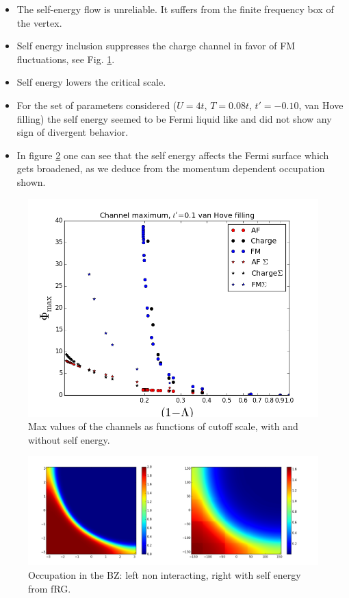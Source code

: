 \begin{itemize}

\item The self-energy flow is unreliable. It suffers from the finite frequency box of the vertex. 

\item Self energy inclusion suppresses the charge channel in favor of FM fluctuations, see Fig. \ref{selfsuppressfrg}. 

\item Self energy lowers the critical scale.

\item For the set of parameters considered ($U=4t$, $T=0.08t$, $t'=-0.10$, van Hove filling) the self energy seemed to be Fermi liquid like and did not show any sign of divergent behavior. 

\item In figure \ref{fermisurface} one can see that the self energy affects the Fermi surface which gets broadened, as we deduce from the momentum dependent occupation shown. 

\end{itemize}

\begin{figure}
\includegraphics[scale=0.7]{images/sevsnose.png}
\caption{Max values of the channels as functions of cutoff scale, with and without self energy. }
\label{selfsuppressfrg}
 \end{figure}
 
 \begin{figure}
 \includegraphics[scale=0.3]{images/Fermi_occupation_sevsnose.png}
 \caption{Occupation in the BZ: left non interacting, right with self energy from fRG.}
\label{fermisurface}
 \end{figure}
